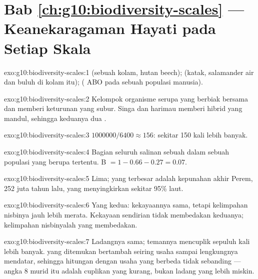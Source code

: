 \section*{Bab \ref{ch:g10:biodiversity-scales} --- Keanekaragaman Hayati pada Setiap Skala}

\begin{solution}{exo:g10:biodiversity-scales:1}
 (sebuah kolam, hutan beech);  (katak, salamander air
dan buluh di kolam itu);  (  ABO pada sebuah populasi
manusia).
\end{solution}

\begin{solution}{exo:g10:biodiversity-scales:2}
Kelompok organisme serupa yang berbiak bersama dan memberi keturunan
yang subur. Singa dan harimau memberi hibrid yang mandul, sehingga
keduanya dua .
\end{solution}

\begin{solution}{exo:g10:biodiversity-scales:3}
$\num{1000000}/6400 \approx 156$: sekitar 150 kali lebih banyak.
\end{solution}

\begin{solution}{exo:g10:biodiversity-scales:4}
Bagian seluruh salinan sebuah  dalam sebuah populasi yang berupa
 tertentu. B $= 1 - 0.66 - 0.27 = 0.07$.
\end{solution}

\begin{solution}{exo:g10:biodiversity-scales:5}
Lima; yang terbesar adalah kepunahan akhir Perem, 252 juta tahun lalu,
yang menyingkirkan sekitar 95\%  laut.
\end{solution}

\begin{solution}{exo:g10:biodiversity-scales:6}
Yang kedua: kekayaannya sama, tetapi kelimpahan nisbinya jauh lebih
merata. Kekayaan sendirian tidak membedakan keduanya; kelimpahan
nisbinyalah yang membedakan.
\end{solution}

\begin{solution}{exo:g10:biodiversity-scales:7}
Ladangnya sama; temannya mencuplik sepuluh kali lebih banyak. 
yang ditemukan bertambah seiring usaha sampai lengkungnya mendatar,
sehingga hitungan dengan usaha yang berbeda tidak sebanding --- angka 8
murid itu adalah cuplikan yang kurang, bukan ladang yang lebih miskin.
\end{solution}

